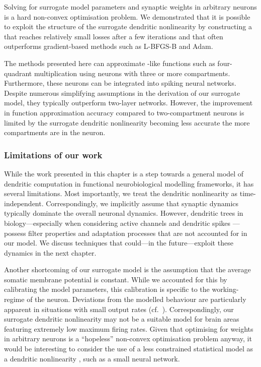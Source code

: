 Solving for surrogate model parameters and synaptic weights in arbitrary \nlif neurons is a hard non-convex optimisation problem.
We demonstrated that it is possible to exploit the structure of the surrogate dendritic nonlinearity by constructing a  that reaches relatively small losses after a few iterations and that often outperforms gradient-based methods such as L-BFGS-B and Adam.

The methods presented here can approximate \XOR-like functions such as four-quadrant multiplication using \nlif neurons with three or more compartments.
Furthermore, these neurons can be integrated into spiking neural networks.
Despite numerous simplifying assumptions in the derivation of our surrogate model, they typically outperform two-layer networks.
However, the improvement in function approximation accuracy compared to two-compartment neurons is limited by the surrogate dendritic nonlinearity becoming less accurate the more compartments are in the neuron.

\subsubsection{Limitations of our work}
While the work presented in this chapter is a step towards a general model of dendritic computation in functional neurobiological modelling frameworks, it has several limitations.
Most importantly, we treat the dendritic nonlinearity \Hden as time-independent.
Correspondingly, we implicitly assume that synaptic dynamics typically dominate the overall neuronal dynamics.
However, dendritic trees in biology---especially when considering active channels and dendritic spikes \citep{koch1999biophysics,koch2002singlecell}---possess filter properties and adaptation processes that are not accounted for in our model.
We discuss techniques that could---in the future---exploit these dynamics in the next chapter.

Another shortcoming of our surrogate model \Hden is the assumption that the average somatic membrane potential is constant.
While we accounted for this by calibrating the model parameters, this calibration is specific to the working-regime of the neuron.
Deviations from the modelled behaviour are particularly apparent in situations with small output rates (cf.~).
Correspondingly, our surrogate dendritic nonlinearity may not be a suitable model for brain areas featuring extremely low maximum firing rates.
Given that optimising for weights in arbitrary \nlif neurons is a \enquote{hopeless} non-convex optimisation problem anyway, it would be interesting to consider the use of a less constrained statistical model as a dendritic nonlinearity \Hden, such as a small neural network.

